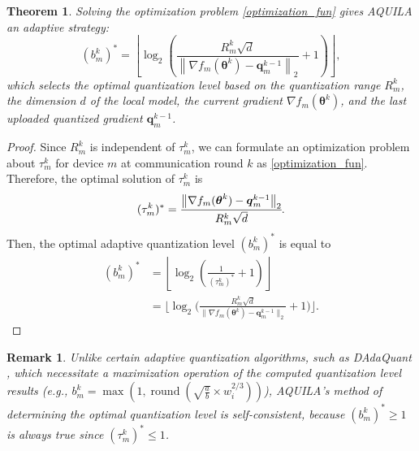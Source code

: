 \documentclass[lettersize,journal]{IEEEtran}
\newtheorem{theorem}{Theorem}
\newtheorem*{remark}{Remark}
\begin{document}
\begin{theorem}
    Solving the optimization problem \eqref{optimization_fun} gives AQUILA an adaptive strategy:
\begin{equation}
(b_m^k)^* = \left\lfloor \log_2 \left(\frac{ R_m^k\sqrt{d}}{\left\|\nabla f_m(\boldsymbol{\theta}^k)-\boldsymbol{q}_{m}^{k-1}\right\|_2} + 1 \right)\right\rfloor,
\label{b_m^k}
\end{equation}
which selects the optimal quantization level based on the quantization range $R_m^k$, the dimension $d$ of the local model, the current gradient $\nabla f_m(\boldsymbol{\theta}^k)$, and the last uploaded quantized gradient $\boldsymbol{q}_{m}^{k-1}$.
\end{theorem}
\begin{proof}
Since $R_m^k$ is independent of $\tau_m^k$, we can formulate an optimization problem about $\tau_m^k$ for device $m$ at communication round $k$ as \eqref{optimization_fun}. Therefore, the optimal solution of $\tau_m^k$ is
\begin{equation}
(\tau_m^k)^*= \cfrac{\big\|\nabla f_m(\boldsymbol{\theta}^k)-\boldsymbol{q}_{m}^{k-1}\big\|_2}{R_m^k \sqrt{d}}.
\label{tau_m^k}
\end{equation}
Then, the optimal adaptive quantization level $(b_m^k)^*$ is equal to
\begin{equation}
\begin{aligned}
(b_m^k)^* &= \left\lfloor \log_2 (\frac{1}{(\tau_m^k)^*} + 1) \right\rfloor \\
&= \bigg\lfloor \log_2 \bigg(\frac{ R_m^k\sqrt{d}}{\big\|\nabla f_m(\boldsymbol{\theta}^k)-\boldsymbol{q}_{m}^{k-1}\big\|_2} + 1 \bigg)\bigg\rfloor.
\end{aligned}
\end{equation}
\end{proof}
\begin{remark}
Unlike certain adaptive quantization algorithms, such as DAdaQuant \cite{honig2022dadaquant}, which necessitate a maximization operation of the computed quantization level results (e.g., $b_m^k=\max (1, \operatorname{round}(\sqrt{\frac{a}{b}} \times w_i^{2 / 3}))$), AQUILA's method of determining the optimal quantization level is self-consistent, because $(b_m^k)^* \geqslant 1 $ is always true since $(\tau_m^k)^*\leqslant 1$.
\end{remark}
\end{document}
